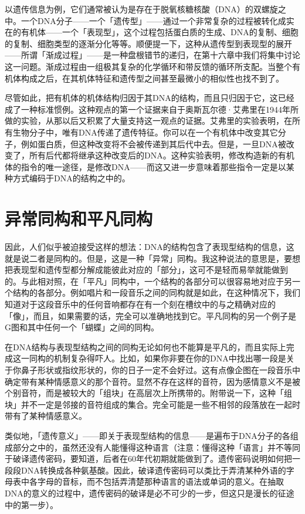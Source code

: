 \documentclass[
  12pt,
  twoside,
  openright,
  oldfontcommands,
]{memoir}
\begin{document}
以遗传信息为例，它们通常被认为是存在于脱氧核糖核酸（DNA）的双螺旋之中。一个DNA分子------一个「遗传型」------通过一个非常复杂的过程被转化成实在的有机体------一个「表现型」，这个过程包括蛋白质的生成、DNA的复制、细胞的复制、细胞类型的逐渐分化等等。顺便提一下，这种从遗传型到表现型的展开------所谓「渐成过程」------是一种盘根错节的递归，在第十六章中我们将集中讨论这一问题。渐成过程由一组极其复杂的化学循环和带反馈的循环所支配。当整个有机体构成之后，在其机体特征和遗传型之间甚至最微小的相似性也找不到了。

尽管如此，把有机体的机体结构归因于其DNA的结构，而且只归因于它，这已经成了一种标准惯例。这种观点的第一个证据来自于奥斯瓦尔德·艾弗里在1944年所做的实验，从那以后又积累了大量支持这一观点的证据。艾弗里的实验表明，在所有生物分子中，唯有DNA传递了遗传特征。你可以在一个有机体中改变其它分子，例如蛋白质，但这种改变将不会被传递到其后代中去。但是，一旦DNA被改变了，所有后代都将继承这种改变后的DNA。这种实验表明，修改构造新的有机体的指令的唯一途径，是修改DNA------而这又进一步意味着那些指令一定是以某种方式编码于DNA的结构之中的。

\section{异常同构和平凡同构}

因此，人们似乎被迫接受这样的想法：DNA的结构包含了表现型结构的信息，这就是说二者是同构的。但是，这是一种「异常」同构。我这种说法的意思是，要想把表现型和遗传型都分解成能彼此对应的「部分」，这可不是轻而易举就能做到的。与此相对照，在「平凡」同构中，一个结构的各部分可以很容易地对应于另一个结构的各部分。例如唱片和一段音乐之间的同构就是如此，在这种情况下，我们知道对于这段音乐中的任何音响都存在有一个刻在槽纹中的与之精确对应的「像」，而且，如果需要的话，完全可以准确地找到它。平凡同构的另一个例子是G图和其中任何一个「蝴蝶」之间的同构。

在DNA结构与表现型结构之间的同构无论如何也不能算是平凡的，而且实际上完成这一同构的机制复杂得吓人。比如，如果你非要在你的DNA中找出哪一段是关于你鼻子形状或指纹形状的，你的日子一定不会好过。这有点像企图在一段音乐中确定带有某种情感意义的那个音符。显然不存在这样的音符，因为感情意义不是被个别音符，而是被较大的「组块」在高层次上所携带的。附带说一下，这种「组块」并不一定是邻接的音符组成的集合。完全可能是一些不相邻的段落放在一起时带有了某种情感意义。

类似地，「遗传意义」------即关于表现型结构的信息------是遍布于DNA分子的各组成部分之中的，虽然还没有人能懂得这种语言（注意：懂得这种「语言」并不等同于破译遗传密码，要知道，后者在60年代初期就能做到了。遗传密码说明如何把一段段DNA转换成各种氨基酸。因此，破译遗传密码可以类比于弄清某种外语的字母表中各字母的音标，而不包括弄清楚那种语言的语法或单词的意义。在抽取DNA的意义的过程中，遗传密码的破译是必不可少的一步，但这只是漫长的征途中的第一步）。
\end{document}
